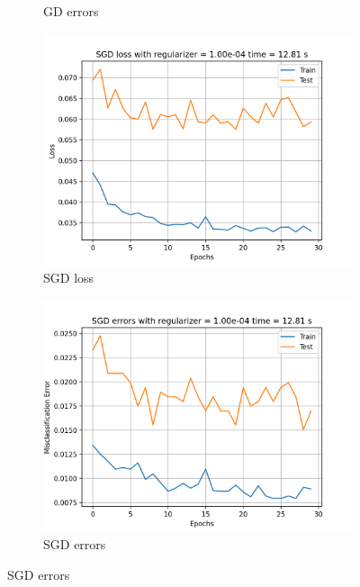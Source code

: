 \documentclass{article}
\begin{document}
\begin{sloppypar}
\begin{aprob}
\begin{enumerate}
\begin{figure}
\begin{subfigure}{0.45\textwidth}
                    \caption{GD errors}
                    \label{fig:gderrors}
                \end{subfigure}
                \hfill
                \begin{subfigure}{0.45\textwidth}
                    \includegraphics[width=\textwidth]{./img/7-sgd-loss.png}
                    \caption{SGD loss}
                    \label{fig:sgdloss}
                \end{subfigure}
                \hfill
                \begin{subfigure}{0.45\textwidth}
                    \includegraphics[width=\textwidth]{./img/7-sgd-errors.png}
                    \caption{SGD errors}
                    \label{fig:sgderrors}

\end{subfigure}
\end{figure}
\end{enumerate}
\end{aprob}
\end{sloppypar}
\end{document}
